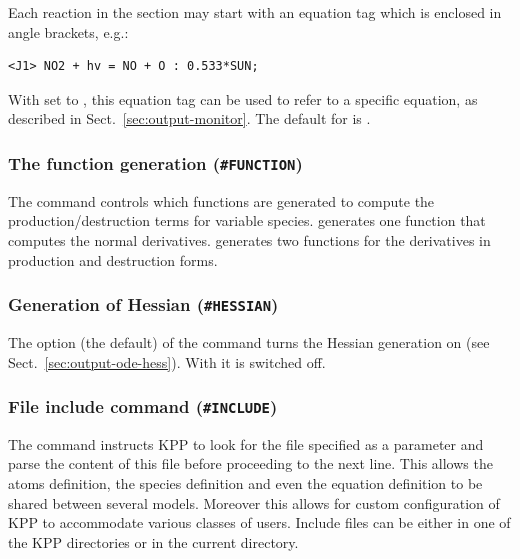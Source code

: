 \documentclass[twoside]{article}
\begin{document}
Each reaction in the  section may start with an
equation tag which is enclosed in angle brackets, e.g.:
%
\begin{verbatim}
<J1> NO2 + hv = NO + O : 0.533*SUN;
\end{verbatim}
%
With  set to , this equation tag can be used to
refer to a specific equation, as described in
Sect.~\ref{sec:output-monitor}. The default for  is
.

\subsubsection{The function generation ({\tt\#FUNCTION})}
\label{sec:command-function}

The  command controls which functions are generated to
compute the production/destruction terms for variable species.
 generates one function that computes the normal
derivatives.  generates two functions for the derivatives in
production and destruction forms.

\subsubsection{Generation of Hessian ({\tt\#HESSIAN})}
\label{sec:command-hessian}

The option  (the default) of the  command turns
the Hessian generation on (see Sect.~\ref{sec:output-ode-hess}). With
 it is switched off.

\subsubsection{File include command ({\tt\#INCLUDE})}
\label{sec:command-include}

The  command instructs KPP to look for the file specified
as a parameter and parse the content of this file before proceeding to
the next line. This allows the atoms definition, the species definition
and even the equation definition to be shared between several models.
Moreover this allows for custom configuration of KPP to accommodate
various classes of users. Include files can be either in one of the KPP
directories or in the current directory.
\end{document}
